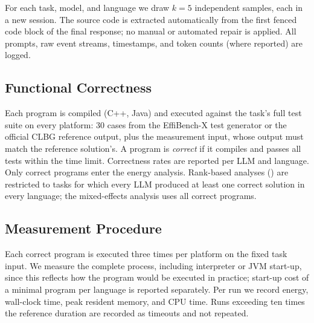 For each task, model, and language we draw $k=5$ independent samples, each in a new
session. The source code is extracted automatically from the first fenced code block of the
final response; no manual or automated repair is applied. All prompts, raw event streams,
timestamps, and token counts (where reported) are logged.

\subsection{Functional Correctness}
Each program is compiled (C++, Java) and executed against the task's full test suite
on every platform: 30 cases from the EffiBench-X test generator or the official CLBG
reference output, plus the measurement input, whose output must match the reference
solution's. A program is \emph{correct} if it compiles and passes all tests within the time
limit. Correctness rates are reported per LLM and language. Only correct programs enter
the energy analysis. Rank-based analyses () are restricted to tasks for which every
LLM produced at least one correct solution in every language; the mixed-effects analysis
uses all correct programs.

\subsection{Measurement Procedure}
Each correct program is executed three times per platform on the fixed task input. We measure
the complete process, including interpreter or JVM start-up, since this reflects how the
program would be executed in practice; start-up cost of a minimal program per language is
reported separately. Per run we record energy, wall-clock time, peak resident memory, and
CPU time. Runs exceeding ten times the reference duration are recorded as timeouts and not
repeated.

